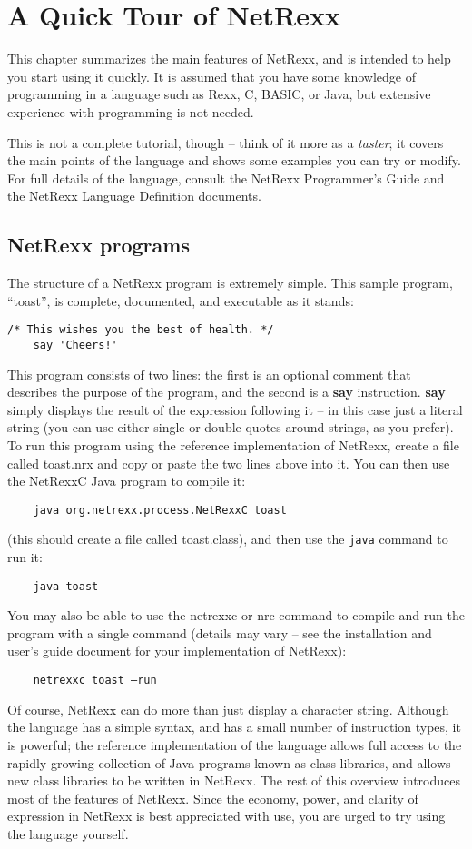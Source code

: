 \chapter{A Quick Tour of NetRexx}
This chapter summarizes the main features of NetRexx, and is intended
to help you start using it quickly. It is assumed that you have some
knowledge of programming in a language such as Rexx, C, BASIC, or
Java, but extensive experience with programming is not needed.

This is not a complete tutorial, though – think of it more as a
\emph{taster}; it covers the main points of the language and shows some
examples you can try or modify. For full details of the language,
consult the NetRexx Programmer's Guide and the NetRexx Language
Definition documents.

\section{NetRexx programs}
The structure of a NetRexx program is extremely simple. This sample
program, “toast”, is complete, documented, and executable as it
stands:
\begin{lstlisting}[label=cheers,caption=Toast]
    /* This wishes you the best of health. */
    say 'Cheers!'
\end{lstlisting}
This program consists of two lines: the first is an optional comment that describes the purpose of the program, and the second is a \textbf{say} instruction. \textbf{say} simply displays the result of the expression following it – in this case just a literal string (you can use either single or double quotes around strings, as you prefer).
To run this program using the reference implementation of NetRexx,
create a file called toast.nrx and copy or paste the two lines above
into it. You can then use the NetRexxC Java program to compile it:
\begin{verbatim}
    java org.netrexx.process.NetRexxC toast
\end{verbatim}
(this should create a file called toast.class), and then use
the \texttt{java} command to run it:
\begin{verbatim}
    java toast
\end{verbatim}
You may also be able to use the netrexxc or nrc command to compile and
run the program with a single command (details may vary – see the
installation and user’s guide document for your implementation of
NetRexx):
\begin{verbatim}
    netrexxc toast –run
\end{verbatim}
Of course, NetRexx can do more than just display a character string. Although the language has a simple syntax, and has a small number of instruction types, it is powerful; the reference implementation of the language allows full access to the rapidly growing collection of Java programs known as class libraries, and allows new class libraries to be written in NetRexx.
The rest of this overview introduces most of the features of NetRexx. Since the economy, power, and clarity of expression in NetRexx is best appreciated with use, you are urged to try using the language yourself.
